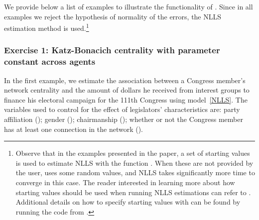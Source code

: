 \documentclass[nojss]{jss}
\begin{document}
We provide below a list of examples to illustrate the functionality of . Since in all examples we reject the hypothesis of normality of the errors, the NLLS estimation method is used.\footnote{Observe that in the examples presented in the paper, a set of starting values is used to estimate NLLS with the function . When these are not provided by the user,  uses some random values, and NLLS takes significantly more time to converge in this case. The reader interested in learning more about how starting values should be used when running NLLS estimations can refer to \cite{Box:1969}. Additional details on how to specify starting values with  can be found by running the code  from .}

\subsubsection{Exercise 1: Katz-Bonacich centrality with parameter constant across agents}
In the first example, we estimate the association between a Congress member's network centrality and the amount of dollars he received from interest groups to finance his electoral campaign for the 111th Congress using model~\ref{NLLS}. The variables used to control for the effect of legislators' characteristics are: party affiliation (); gender (); chairmanship (); whether or not the Congress member has at least one connection in the network ().
\end{document}
